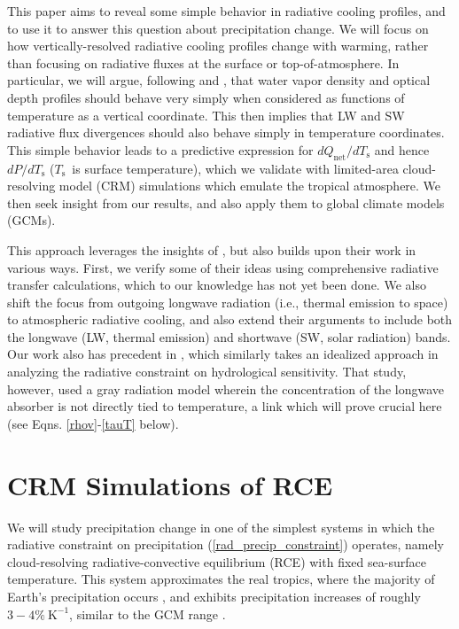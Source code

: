 \documentclass[9pt,twocolumn,twoside,lineno]{pnas-new}
\newcommand{\eqnref}[1]{(\ref{#1})}
\newcommand{\Qnet}{\ensuremath{Q_\mathrm{net}}}
\newcommand{\Kinverse}{\ensuremath{\mathrm{K^{-1}}}}
\newcommand{\Ts}{\ensuremath{T_\mathrm{s}}}
\begin{document}
This paper aims to reveal some simple behavior in radiative cooling profiles, and to use it to  answer this question about precipitation change. We will  focus on how vertically-resolved radiative cooling profiles change with warming, rather than focusing on radiative fluxes at the surface or top-of-atmosphere. In particular, we will argue, following \cite{simpson1928} and \cite{ingram2010}, that water vapor density and optical depth profiles should behave very simply when considered as functions of temperature as a vertical coordinate. This then implies  that LW and SW radiative flux divergences should also behave simply in temperature coordinates. This simple behavior leads to a predictive expression for $d\Qnet/d\Ts$ and hence $dP/d\Ts$ (\Ts\ is surface temperature), which we validate with limited-area cloud-resolving model (CRM) simulations which emulate  the tropical atmosphere. We then seek insight from our results, and also apply them  to global climate models (GCMs). 


This approach leverages the insights of \cite{simpson1928, ingram2010}, but also builds upon their work in various ways. First, we verify some of their ideas using comprehensive radiative transfer calculations, which to our knowledge has not yet been done. We also shift the focus from outgoing longwave radiation (i.e., thermal emission to space) to atmospheric radiative cooling, and also extend their  arguments to include both the longwave (LW, thermal emission) and shortwave (SW, solar radiation) bands. Our work also has precedent in \cite{takahashi2009}, which similarly takes an idealized approach in analyzing the radiative constraint on hydrological sensitivity. That study, however,  used a gray radiation model wherein the concentration of the longwave absorber is not directly tied to temperature, a  link which will prove crucial here (see Eqns. \ref{rhov}-\ref{tauT} below).

\section{CRM Simulations of RCE}
We will study precipitation change in one of the simplest systems in which the radiative constraint on precipitation \eqnref{rad_precip_constraint} operates, namely cloud-resolving radiative-convective equilibrium (RCE) with fixed sea-surface temperature. This system approximates the real tropics, where the majority of Earth's precipitation occurs \cite{simpson1988}, and exhibits precipitation increases of roughly $3 -4\%\ \Kinverse$, similar to the GCM range \cite{romps2011, muller2011b}.  
\end{document}
